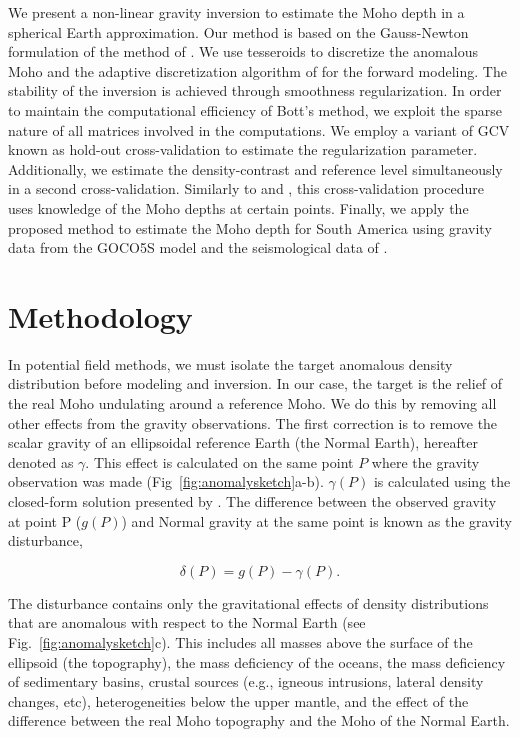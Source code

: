 \documentclass[extra,mreferee]{gji}
\begin{document}
We present a non-linear gravity inversion to estimate the Moho depth in
a spherical Earth approximation.
Our method is based on the \citet{silva2014} Gauss-Newton formulation of the
method of \citet{bott1960}.
We use tesseroids to discretize the anomalous Moho and the adaptive
discretization algorithm of \citet{uieda2016} for the forward modeling.
The stability of the inversion is achieved through smoothness regularization.
In order to maintain the computational efficiency of Bott's method,
we exploit the sparse nature of all matrices involved in the computations.
We employ a variant of GCV known as hold-out cross-validation \citep{kim2009}
to estimate the regularization parameter.
Additionally, we estimate the density-contrast and reference level
simultaneously in a second cross-validation.
Similarly to \citet{silva2006} and \citet{martins2010}, this cross-validation
procedure uses knowledge of the Moho depths at certain points.
Finally, we apply the proposed method to estimate the Moho depth for South
America using gravity data from the GOCO5S model \citep{mayer-guerr2015} and
the seismological data of \citet{assumpcao2013a}.



\section{Methodology}

In potential field methods, we must isolate the target anomalous density
distribution before modeling and inversion.
In our case, the target is the relief of the real Moho undulating around a
reference Moho.
We do this by removing all other effects from the gravity observations.
The first correction is to remove the
scalar gravity of an ellipsoidal reference Earth (the Normal Earth),
hereafter denoted as $\gamma$.
This effect is calculated on the same point $P$ where
the gravity observation was made
(Fig~\ref{fig:anomalysketch}a-b).
$\gamma(P)$ is calculated using
the closed-form solution presented by \citet{li2001a}.
The difference between the observed gravity at point P ($g(P)$)
and Normal gravity at the same point
is known as the gravity disturbance,

\begin{equation}
    \delta(P) = g(P) - \gamma(P).
    \label{eq:disturbance}
\end{equation}

The disturbance contains only the gravitational effects of density
distributions that are anomalous with respect to the Normal Earth
(see Fig.~\ref{fig:anomalysketch}c).
This includes all masses above the surface of the ellipsoid (the topography),
the mass deficiency of the oceans,
the mass deficiency of sedimentary basins,
crustal sources (e.g., igneous intrusions, lateral density changes, etc),
heterogeneities below the upper mantle,
and the effect of the difference between the real Moho
topography and the Moho of the Normal Earth.
\end{document}
